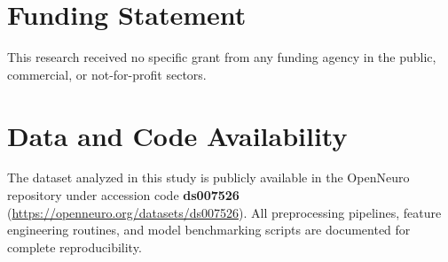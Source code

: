 \documentclass[review,12pt]{elsarticle}
\begin{document}
\section*{Funding Statement}
This research received no specific grant from any funding agency in the public, commercial, or not-for-profit sectors.

\section*{Data and Code Availability}
The dataset analyzed in this study is publicly available in the OpenNeuro repository under accession code \textbf{ds007526} (\url{https://openneuro.org/datasets/ds007526}). All preprocessing pipelines, feature engineering routines, and model benchmarking scripts are documented for complete reproducibility.
\end{document}
